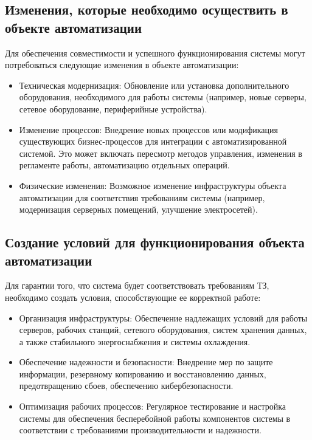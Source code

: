 \subsection{Изменения, которые необходимо осуществить в объекте автоматизации}
Для обеспечения совместимости и успешного функционирования системы могут потребоваться следующие изменения в объекте автоматизации:

\begin{itemize}
    \item Техническая модернизация: Обновление или установка дополнительного оборудования, необходимого для работы системы (например, новые серверы, сетевое оборудование, периферийные устройства).
    \item Изменение процессов: Внедрение новых процессов или модификация существующих бизнес-процессов для интеграции с автоматизированной системой. Это может включать пересмотр методов управления, изменения в регламенте работы, автоматизацию отдельных операций.
    \item Физические изменения: Возможное изменение инфраструктуры объекта автоматизации для соответствия требованиям системы (например, модернизация серверных помещений, улучшение электросетей).

\end{itemize}

\subsection{Создание условий для функционирования объекта автоматизации}

Для гарантии того, что система будет соответствовать требованиям ТЗ, необходимо
создать условия, способствующие ее корректной работе:
\begin{itemize}
    \item Организация инфраструктуры: Обеспечение надлежащих условий для работы серверов, рабочих станций, сетевого оборудования, систем хранения данных, а также стабильного энергоснабжения и системы охлаждения.
    \item Обеспечение надежности и безопасности: Внедрение мер по защите информации, резервному копированию и восстановлению данных, предотвращению сбоев, обеспечению кибербезопасности.
    \item Оптимизация рабочих процессов: Регулярное тестирование и настройка системы для обеспечения бесперебойной работы компонентов системы в соответствии с требованиями производительности и надежности.

\end{itemize}

